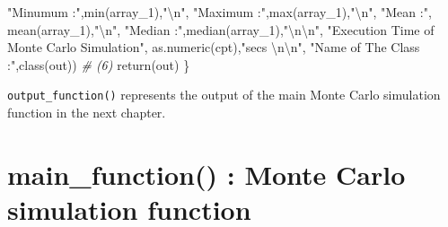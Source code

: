 \documentclass[11pt,a4paper]{article}
\newenvironment{Shaded}{\begin{snugshade}}{\end{snugshade}}
\newcommand{\CommentTok}[1]{\textcolor[rgb]{0.56,0.35,0.01}{\textit{#1}}}
\newcommand{\FunctionTok}[1]{\textcolor[rgb]{0.00,0.00,0.00}{#1}}
\newcommand{\NormalTok}[1]{#1}
\newcommand{\SpecialCharTok}[1]{\textcolor[rgb]{0.00,0.00,0.00}{#1}}
\newcommand{\StringTok}[1]{\textcolor[rgb]{0.31,0.60,0.02}{#1}}
\begin{document}
\begin{Shaded}
\begin{Highlighting}[]
           \StringTok{"Minumum :"}\NormalTok{,}\FunctionTok{min}\NormalTok{(array\_1),}\StringTok{"}\SpecialCharTok{\textbackslash{}n}\StringTok{"}\NormalTok{,}
           \StringTok{"Maximum :"}\NormalTok{,}\FunctionTok{max}\NormalTok{(array\_1),}\StringTok{"}\SpecialCharTok{\textbackslash{}n}\StringTok{"}\NormalTok{,}
           \StringTok{"Mean    :"}\NormalTok{, }\FunctionTok{mean}\NormalTok{(array\_1),}\StringTok{"}\SpecialCharTok{\textbackslash{}n}\StringTok{"}\NormalTok{,}
           \StringTok{"Median  :"}\NormalTok{,}\FunctionTok{median}\NormalTok{(array\_1),}\StringTok{"}\SpecialCharTok{\textbackslash{}n\textbackslash{}n}\StringTok{"}\NormalTok{,}
           \StringTok{"Execution Time of Monte Carlo Simulation"}\NormalTok{,}
           \FunctionTok{as.numeric}\NormalTok{(cpt),}\StringTok{"secs }\SpecialCharTok{\textbackslash{}n\textbackslash{}n}\StringTok{"}\NormalTok{,}
           \StringTok{"Name of The Class :"}\NormalTok{,}\FunctionTok{class}\NormalTok{(out))}
  \CommentTok{\# (6)}
  \FunctionTok{return}\NormalTok{(out)}
\NormalTok{\}}
\end{Highlighting}
\end{Shaded}

\texttt{output\_function()} represents the output of the main Monte
Carlo simulation function in the next chapter.

\hypertarget{main_function-monte-carlo-simulation-function}{%
\section{main\_function() : Monte Carlo simulation
function}\label{main_function-monte-carlo-simulation-function}}
\end{document}
